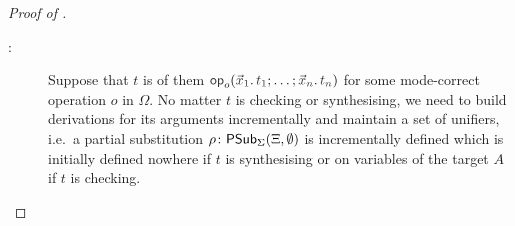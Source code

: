 \begin{proof}[Proof of {}]
\begin{description}
    \item[:]
      Suppose that $t$ is of them $\tmOpts$ for some mode-correct operation $o$ in $\Omega$.
      No matter $t$ is checking or synthesising, we need to build derivations for its arguments incrementally and maintain a set of unifiers, i.e.\ a partial substitution $\rho\colon \mathsf{PSub}_{\Sigma}(\Xi,\emptyset)$ is incrementally defined which is initially defined nowhere if $t$ is synthesising or on variables of the target $A$ if $t$ is checking. 

  \end{description}
\end{proof}

